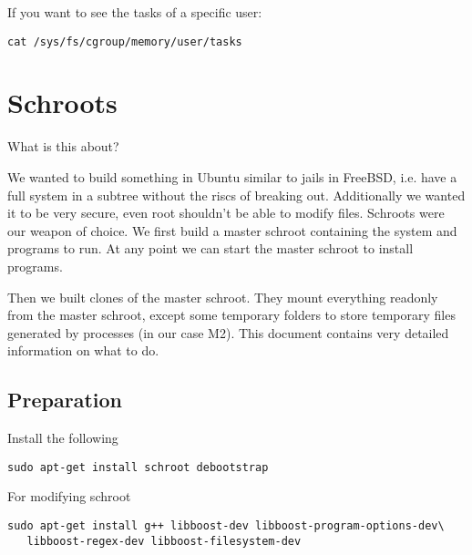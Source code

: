 \documentclass[a4paper]{book}
\begin{document}
If you want to see the tasks of a specific user:
\begin{verbatim}
cat /sys/fs/cgroup/memory/user/tasks
\end{verbatim}

\chapter{Schroots}
What is this about?

We wanted to build something in Ubuntu similar to jails in FreeBSD, i.e. have a
full system in a subtree without the riscs of breaking out.  Additionally we
wanted it to be very secure, even root shouldn't be able to modify files.
Schroots were our weapon of choice. We first build a master schroot containing
the system and programs to run. At any point we can start the master schroot to
install programs.

Then we built clones of the master schroot. They mount everything readonly from
the master schroot, except some temporary folders to store temporary files
generated by processes (in our case M2). This document contains very detailed
information on what to do.

\section{Preparation}

Install the following

\begin{verbatim}
sudo apt-get install schroot debootstrap
\end{verbatim}

For modifying schroot

\begin{verbatim}
sudo apt-get install g++ libboost-dev libboost-program-options-dev\
   libboost-regex-dev libboost-filesystem-dev
\end{verbatim}
\end{document}

